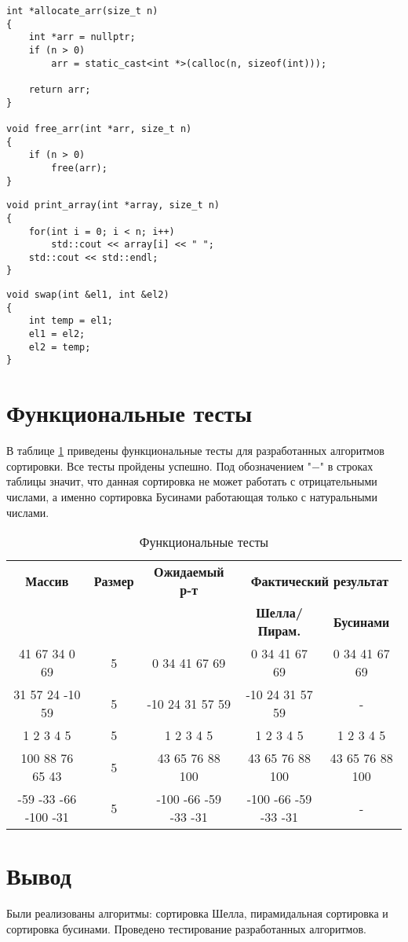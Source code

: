 \clearpage

\begin{lstlisting}[label=lst:allocate,caption=Функции выделение и освобождение памяти под массив]
int *allocate_arr(size_t n)
{
	int *arr = nullptr;
	if (n > 0)
		arr = static_cast<int *>(calloc(n, sizeof(int)));
	
	return arr;
}

void free_arr(int *arr, size_t n)
{
	if (n > 0)
		free(arr);
}
\end{lstlisting}

\begin{lstlisting}[label=lst:print,caption=Функция вывода print\_arr]
void print_array(int *array, size_t n)
{
	for(int i = 0; i < n; i++)
		std::cout << array[i] << " ";
	std::cout << std::endl;
}
\end{lstlisting}

\begin{lstlisting}[label=lst:swap,caption=Функция перестановки элементов места swap]
void swap(int &el1, int &el2)
{
	int temp = el1;
	el1 = el2;
	el2 = temp;
}
\end{lstlisting}

\clearpage

\section{Функциональные тесты}

В таблице \ref{tbl:func_tests} приведены функциональные тесты для разработанных алгоритмов сортировки. Все тесты пройдены успешно.
Под обозначением "$-$" в строках таблицы значит, что данная сортировка не может работать с отрицательными числами, а именно сортировка Бусинами работающая только с натуральными числами.

\begin{table}[ht]
	\small
	\begin{center}
		\caption{Функциональные тесты}
		\label{tbl:func_tests}
		\begin{tabular}{|c|c|c|c|c|}
			\hline
			\bfseries Массив
			& \bfseries Размер
			& \bfseries Ожидаемый р-т
			& \multicolumn{2}{c|}{\bfseries Фактический результат} \\ \cline{4-5}
			& & & \bfseries Шелла/Пирам. & \bfseries Бусинами \\
			\hline
			41 67 34 0 69 & 5 & 0 34 41 67 69 & 0 34 41 67 69 & 0 34 41 67 69 \\
			\hline
			31 57 24 -10 59 & 5 & -10 24 31 57 59 & -10 24 31 57 59 & - \\
			\hline
			1 2 3 4 5 & 5 & 1 2 3 4 5 & 1 2 3 4 5 & 1 2 3 4 5 \\
			\hline
			100 88 76 65 43 & 5 & 43 65 76 88 100 & 43 65 76 88 100 & 43 65 76 88 100 \\
			\hline
			-59 -33 -66 -100 -31 & 5 & -100 -66 -59 -33 -31 & -100 -66 -59 -33 -31 & - \\
			\hline
		\end{tabular}
	\end{center}
\end{table}

\section{Вывод}

Были реализованы алгоритмы: сортировка Шелла, пирамидальная сортировка и сортировка бусинами. Проведено тестирование разработанных алгоритмов.
